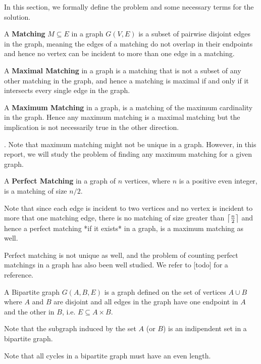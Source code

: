 In this section, we formally define the problem and some necessary terms for the solution.

\begin{definition}
A \textbf{Matching} $M \subseteq E$ in a graph $G(V, E)$ is a subset of pairwise disjoint edges in the graph, meaning the edges of a matching do not overlap in their endpoints and hence no vertex can be incident to more than one edge in a matching.
\end{definition}

\begin{definition}
A \textbf{Maximal Matching} in a graph is a matching that is not a subset of any other matching in the graph, and hence a matching is maximal if and only if it intersects every single edge in the graph.
\end{definition}

\begin{definition}
A \textbf{Maximum Matching} in a graph, is a matching of the maximum cardinality in the graph. Hence any maximum matching is a maximal matching but the implication is not necessarily true in the other direction.
\end{definition}.
Note that maximum matching might not be unique in a graph. However, in this report, we will study the problem of finding any maximum matching for a given graph.

\begin{definition}
A \textbf{Perfect Matching} in a graph of $n$ vertices, where $n$ is a positive even integer, is a matching of size $n/2$.
\end{definition}
Note that since each edge is incident to two vertices and no vertex is incident to more that one matching edge, there is no matching of size greater than $\ceil*{ \frac{n}{2}}$ and hence a perfect matching *if it exists* in a graph, is a maximum matching as well.

Perfect matching is not unique as well, and the problem of counting perfect matchings in a graph has also been well studied. We refer to [todo] for a reference.

\begin{definition}
	A Bipartite graph $G(A,B,E)$ is a graph defined on the set of vertices $A \cup B$ where $A$ and $B$ are disjoint and all edges in the graph have one endpoint in $A$ and the other in $B$, i.e. $E \subseteq A \times B$.
\end{definition}
Note that the subgraph induced by the set $A$ (or $B$) is an indipendent set in a bipartite graph.

Note that all cycles in a bipartite graph must have an even length.

